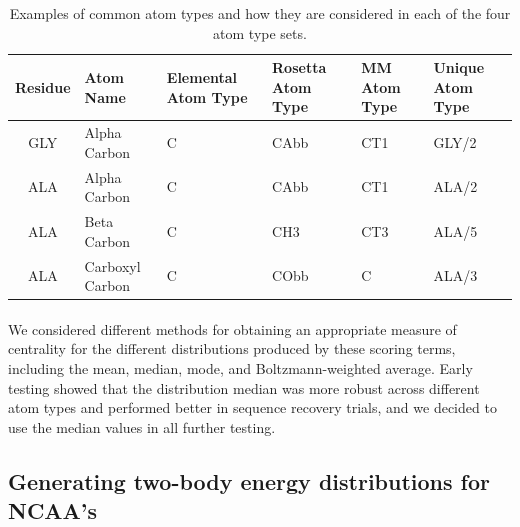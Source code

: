 \begin{table}[!htbp]

\fontsize{9pt}{9pt}
\selectfont

\begin{tabular}{c|lllll}
Residue & Atom Name & Elemental Atom Type & Rosetta Atom Type & MM Atom Type & Unique Atom Type\\
\hline
GLY & Alpha Carbon & C & CAbb & CT1 & GLY/2\\
ALA & Alpha Carbon & C & CAbb & CT1 & ALA/2\\
ALA & Beta Carbon & C & CH3 & CT3 & ALA/5\\
ALA & Carboxyl Carbon & C & CObb & C & ALA/3\\
\end{tabular}

\fontsize{10pt}{11pt}
\selectfont
\caption{Examples of common atom types and how they are considered in each of the four atom type sets.}
\label{tab:atypes_example}

\end{table}



\paragraph{}
We considered different methods for obtaining an appropriate measure of centrality for the different distributions produced by these scoring terms, including the mean, median, mode, and Boltzmann-weighted average.
Early testing showed that the distribution median was more robust across different atom types and performed better in sequence recovery trials, and we decided to use the median values in all further testing.


\subsection{Generating two-body energy distributions for NCAA's} 
